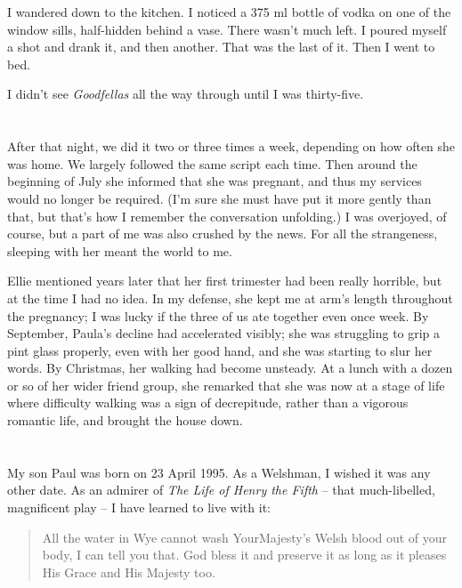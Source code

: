 I wandered down to the kitchen. I noticed a 375 ml bottle of vodka on one of the window sills, half-hidden behind a vase. There wasn't much left. I poured myself a shot and drank it, and then another. That was the last of it. Then I went to bed.

I didn't see \textit{Goodfellas} all the way through until I was thirty-five.

\section{}

After that night, we did it two or three times a week, depending on how often she was home. We largely followed the same script each time. Then around the beginning of July she informed that she was pregnant, and thus my services would no longer be required. (I'm sure she must have put it more gently than that, but that's how I remember the conversation unfolding.) I was overjoyed, of course, but a part of me was also crushed by the news. For all the strangeness, sleeping with her meant the world to me.

Ellie mentioned years later that her first trimester had been really horrible, but at the time I had no idea. In my defense, she kept me at arm's length throughout the pregnancy; I was lucky if the three of us ate together even once week. By September, Paula's decline had accelerated visibly; she was struggling to grip a pint glass properly, even with her good hand, and she was starting to slur her words. By Christmas, her walking had become unsteady. At a lunch with a dozen or so of her wider friend group, she remarked that she was now at a stage of life where difficulty walking was a sign of decrepitude, rather than a vigorous romantic life, and brought the house down.

\section{}

My son Paul was born on 23 April 1995. As a Welshman, I wished it was any other date. As an admirer of \textit{The Life of Henry the Fifth} -- that much-libelled, magnificent play -- I have learned to live with it:

\begin{quote}
    All the water in Wye cannot wash Your\linebreak Majesty's Welsh blood out of your body, I can tell you that. God bless it and preserve it as long as it pleases His Grace and His Majesty too.
\end{quote}

